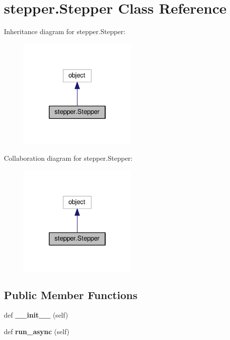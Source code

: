 \hypertarget{classstepper_1_1Stepper}{}\section{stepper.\+Stepper Class Reference}
\label{classstepper_1_1Stepper}


Inheritance diagram for stepper.\+Stepper\+:\nopagebreak
\begin{figure}[H]
\begin{center}
\leavevmode
\includegraphics[width=166pt]{classstepper_1_1Stepper__inherit__graph}
\end{center}
\end{figure}


Collaboration diagram for stepper.\+Stepper\+:\nopagebreak
\begin{figure}[H]
\begin{center}
\leavevmode
\includegraphics[width=166pt]{classstepper_1_1Stepper__coll__graph}
\end{center}
\end{figure}
\subsection*{Public Member Functions}
\begin{DoxyCompactItemize}
\item 
def {\bfseries \+\_\+\+\_\+init\+\_\+\+\_\+} (self)\hypertarget{classstepper_1_1Stepper_aaad0869347ab473e035679f01f296790}{}\label{classstepper_1_1Stepper_aaad0869347ab473e035679f01f296790}

\item 
def {\bfseries run\+\_\+async} (self)\hypertarget{classstepper_1_1Stepper_aa5a2d8c11f92fdf6a81182cbed4a758c}{}\label{classstepper_1_1Stepper_aa5a2d8c11f92fdf6a81182cbed4a758c}

\end{DoxyCompactItemize}
